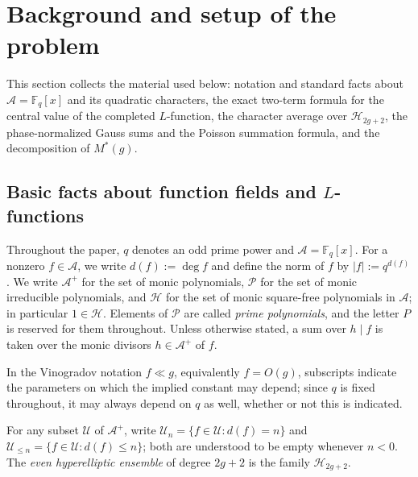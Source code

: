 \documentclass[a4paper,reqno]{amsart}
\numberwithin{equation}{section}
\theoremstyle{remark}
\theoremstyle{definition}
\newcommand{\A}{\mathcal{A}}
\begin{document}

\section{Background and setup of the problem}\label{sec:setup}

This section collects the material used below: notation and standard facts
about $\A=\mathbb F_q[x]$ and its quadratic characters, the exact two-term
formula for the central value of the completed $L$-function, the character
average over $\mathcal H_{2g+2}$, the phase-normalized Gauss sums and the
Poisson summation formula, and the decomposition of $M^*(g)$.

\subsection{Basic facts about function fields and \texorpdfstring{$L$}{L}-functions}\label{sec:ff}

Throughout the paper, $q$ denotes an odd prime power and $\A=\mathbb F_q[x]$.
For a nonzero $f\in\A$, we write $d(f):=\deg f$ and define the norm of $f$ by $|f|:=q^{d(f)}$.
We write $\A^+$ for the set of monic polynomials, $\mathcal P$ for
the set of monic irreducible polynomials, and $\mathcal H$ for the
set of monic square-free polynomials in $\A$; in particular
$1\in\mathcal H$.
Elements of $\mathcal P$ are called \emph{prime polynomials}, and the
letter $P$ is reserved for them throughout.
Unless otherwise stated, a sum over $h\mid f$ is taken over the monic
divisors $h\in\A^+$ of $f$.

In the Vinogradov notation $f\ll g$, equivalently $f=O(g)$, subscripts
indicate the parameters on which the implied constant may depend; since $q$
is fixed throughout, it may always depend on $q$ as well, whether or not
this is indicated.

For any subset $\mathcal{U}$ of $\A^{+}$, write $\mathcal{U}_{n} = \{f \in \mathcal{U} : d(f) = n\}$
and $\mathcal{U}_{\le n} = \{f \in \mathcal{U} : d(f) \le n\}$; both are
understood to be empty whenever $n<0$.
The \emph{even hyperelliptic ensemble} of degree $2g+2$ is the
family $\mathcal H_{2g+2}$.
\end{document}
